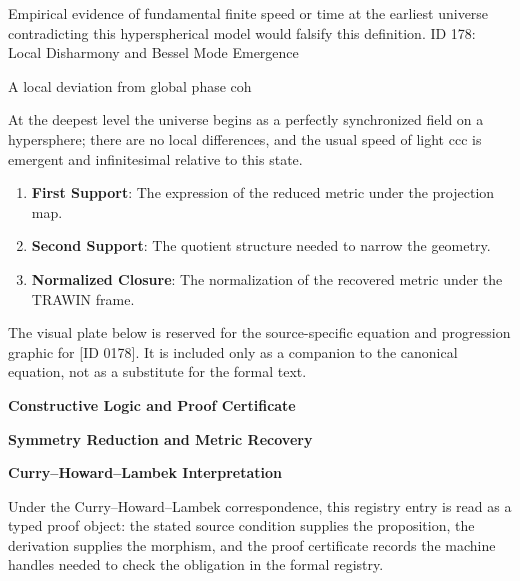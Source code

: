 Empirical evidence of fundamental finite speed or time at the earliest universe contradicting this hyperspherical model would falsify this definition. ID 178: Local Disharmony and Bessel Mode Emergence  

A local deviation from global phase coh

At the deepest level the universe begins as a perfectly synchronized field on a hypersphere; there are no local differences, and the usual speed of light ccc is emergent and infinitesimal relative to this state.
\endgroup

\begin{enumerate}[leftmargin=1.6em,itemsep=6pt,topsep=4pt]
\item \textbf{First Support}: The expression of the reduced metric under the projection map.
\item \textbf{Second Support}: The quotient structure needed to narrow the geometry.
\item \textbf{Normalized Closure}: The normalization of the recovered metric under the TRAWIN frame.
\end{enumerate}

\begingroup\footnotesize\sloppy
The visual plate below is reserved for the source-specific equation and progression graphic for [ID 0178]. It is included only as a companion to the canonical equation, not as a substitute for the formal text.
\par\endgroup
\ifTZPDarkEdition
{}
\fi

\clearpage
\begingroup\tzpsupportsetup
\noindent\textbf{\fontsize{10.8pt}{12.8pt}\selectfont [ID 0178] Constructive Logic and Proof Certificate}\par
\noindent\textbf{\fontsize{10pt}{12pt}\selectfont Symmetry Reduction and Metric Recovery}\par
\vspace{0.45em}
\begingroup
\footnotesize
\setlength{\parskip}{0.22em}
\setlength{\parindent}{0pt}
\noindent\textbf{Curry--Howard--Lambek Interpretation}\par
Under the Curry--Howard--Lambek correspondence, this registry entry is read as a typed proof
object: the stated source condition supplies the proposition, the derivation supplies the
morphism, and the proof certificate records the machine handles needed to check the obligation
in the formal registry.

